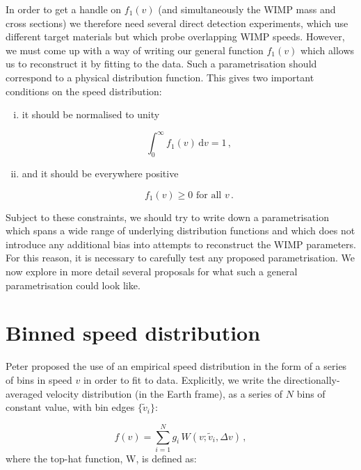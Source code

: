 In order to get a handle on $f_1(v)$ (and simultaneously the WIMP mass and cross sections) we therefore need several direct detection experiments, which use different target materials but which probe overlapping WIMP speeds. However, we must come up with a way of writing our general function $f_1(v)$ which allows us to reconstruct it by fitting to the data. Such a parametrisation should correspond to a physical distribution function. This gives two important conditions on the speed distribution:

\begin{enumerate}[(i)]

\item it should be normalised to unity

\begin{equation}
\int_0^\infty f_1(v) \, \textrm{d}v = 1\,,
\end{equation}

\item and it should be everywhere positive

\begin{equation}
f_1(v) \geq 0 \textrm{ for all  } v\,.
\end{equation}
\end{enumerate}
Subject to these constraints, we should try to write down a parametrisation which spans a wide range of underlying distribution functions and which does not introduce any additional bias into attempts to reconstruct the WIMP parameters. For this reason, it is necessary to carefully test any proposed parametrisation. We now explore in more detail several proposals for what such a general parametrisation could look like.

\section{Binned speed distribution}
\label{sec:Speed:binned}
Peter proposed the use of an empirical speed distribution in the form of a series of bins in speed $v$ in order to fit to data. Explicitly, we write the directionally-averaged velocity distribution (in the Earth frame), as a series of \(N\) bins of constant value, with bin edges \(\{ \tilde{v}_i\}\):

\begin{equation}
\label{eq:Speed:binned}
f(v) = \sum_{i = 1}^N g_i \, W(v;\tilde{v}_i,\Delta v) \,,
\end{equation}
where the top-hat function, W, is defined as:

